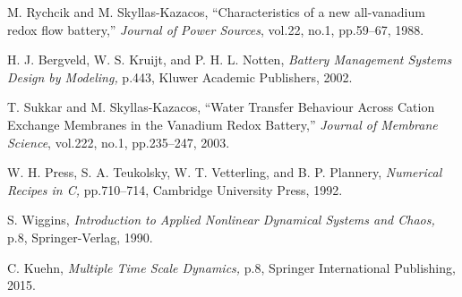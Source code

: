 \documentclass[a4paper]{article}
\begin{document}
\begin{thebibliography}{10}
M. Rychcik and M. Skyllas-Kazacos,
``Characteristics of a new all-vanadium redox flow battery,''
{\it Journal of Power Sources},
vol.22, no.1, pp.59--67, 1988.

H. J. Bergveld, W. S. Kruijt, and P. H. L. Notten,
{\it Battery Management Systems Design by Modeling,}
p.443,
Kluwer Academic Publishers, 2002.

T. Sukkar and M. Skyllas-Kazacos,
``Water Transfer Behaviour Across Cation Exchange Membranes in the Vanadium
  Redox Battery,''
{\it Journal of Membrane Science},
vol.222, no.1, pp.235--247, 2003.

W. H. Press, S. A. Teukolsky, W. T. Vetterling, and B. P. Plannery,
{\it Numerical Recipes in C,}
pp.710--714,
Cambridge University Press, 1992.

S. Wiggins,
{\it Introduction to Applied Nonlinear Dynamical Systems and Chaos,}
p.8,
Springer-Verlag, 1990.

C. Kuehn,
{\it Multiple Time Scale Dynamics,}
p.8,
Springer International Publishing, 2015.

\end{thebibliography}
\end{document}
